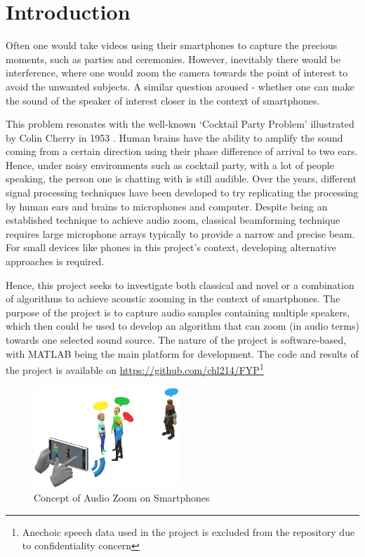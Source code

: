 \documentclass[a4paper,twoside,12pt,hidelinks]{article}
\begin{document}
\section{Introduction}
Often one would take videos using their smartphones to capture the precious moments, such as parties and ceremonies. However, inevitably there would be interference, where one would zoom the camera towards the point of interest to avoid the unwanted subjects. A similar question aroused - whether one can make the sound of the speaker of interest closer in the context of smartphones. 

This problem resonates with the well-known `Cocktail Party Problem' illustrated by Colin Cherry in 1953 \cite{Cherry1953SomeEars}. Human brains have the ability to amplify the sound coming from a certain direction using their phase difference of arrival to two ears. Hence, under noisy environments such as cocktail party, with a lot of people speaking, the person one is chatting with is still audible. Over the years, different signal processing techniques have been developed to try replicating the processing by human ears and brains to microphones and computer. \cite{Mitchell1971SignalEffect} Despite being an established technique to achieve audio zoom, classical beamforming technique requires large microphone arrays typically to provide a narrow and precise beam. For small devices like phones in this project's context, developing alternative approaches is required.

Hence, this project seeks to investigate both classical and novel or a combination of algorithms to achieve acoustic zooming in the context of smartphones. The purpose of the project is to capture audio samples containing multiple speakers, which then could be used to develop an algorithm that can zoom (in audio terms) towards one selected sound source. The nature of the project is software-based, with MATLAB being the main platform for development. The code and results of the project is available on \url{https://github.com/chl214/FYP}\footnote{Anechoic speech data used in the project is excluded from the repository due to confidentiality concern}
\begin{figure}[H]
\centering
\includegraphics[width=0.49\textwidth]{audiozoom}
\caption{Concept of Audio Zoom on Smartphones}
\end{figure}
\end{document}
